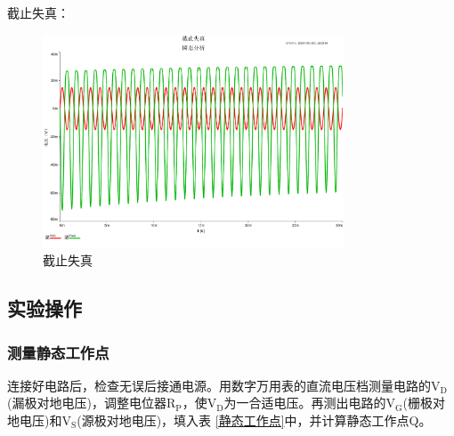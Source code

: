 \documentclass[a4paper]{article}
\theoremstyle{definition}
\theoremstyle{plain}
\theoremstyle{remark}
\newcommand{\reftab}[1]{表 \ref{#1}}
\begin{document}
截止失真：
\begin{figure}[H]
	\centering
	\includegraphics[width=0.8\textwidth]{截止失真}
	\caption{截止失真}
	\label{截止失真}
\end{figure}

\subsection{实验操作}
\subsubsection{测量静态工作点}
连接好电路后，检查无误后接通电源。用数字万用表的直流电压档测量电路的$\mathrm{V_D}$(漏极对地电压)，调整电位器$\mathrm{R_P}$，使$\mathrm{V_D}$为一合适电压。再测出电路的$\mathrm{V_G}$(栅极对地电压)和$\mathrm{V_S}$(源极对地电压)，填入\reftab{静态工作点}中，并计算静态工作点Q。
\vspace{1em}
\end{document}
